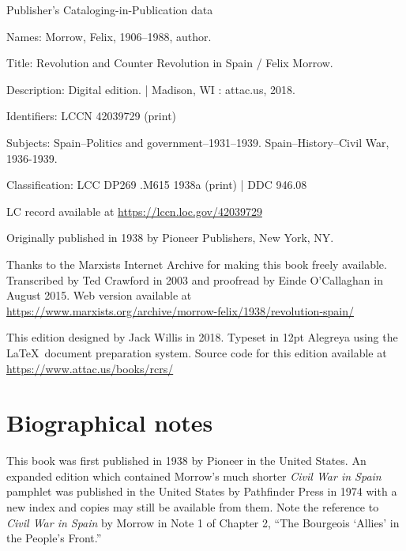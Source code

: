 {
\setlength{\parindent}{0em}
\setlength{\parskip}{0.5em}
\sloppy

\vspace*{\fill}

Publisher’s Cataloging-in-Publication data

\vspace{0.5em}

{\setlength{\parskip}{0em}
Names: Morrow, Felix, 1906--1988, author.

Title: Revolution and Counter Revolution in Spain / Felix Morrow.

Description: Digital edition. | Madison, WI : 
attac.us, 2018.

Identifiers: LCCN 42039729 (print)

\hangindent=0.7cm
Subjects: Spain--Politics and government--1931--1939. Spain--History--Civil War, 1936-1939.

Classification: LCC DP269 .M615 1938a (print) | DDC 946.08

LC record available at \url{https://lccn.loc.gov/42039729}
}

\vspace*{\fill}

Originally published in 1938 by Pioneer Publishers, New York, NY.

Thanks to the Marxists Internet Archive
for making this book freely available.
Transcribed by Ted Crawford in 2003
and proofread by Einde O’Callaghan in August 2015.
Web version available at
\url{https://www.marxists.org/archive/morrow-felix/1938/revolution-spain/}

This edition designed by Jack Willis in 2018.
Typeset in 12pt Alegreya using the \LaTeX\ document preparation system.
Source code for this edition available at \url{https://www.attac.us/books/rcrs/}
}

\newpage

\chapter{Biographical notes}

This book was first published in 1938 by Pioneer in the United States.
An expanded edition which contained Morrow’s much shorter \emph{Civil War in Spain} pamphlet was published in the United States by Path\-finder Press in 1974 with a new index and copies may still be available from them. Note the reference to \emph{Civil War in Spain} by Morrow in Note 1 of Chapter 2, ``The Bourgeois ‘Allies’ in the People’s Front.''

